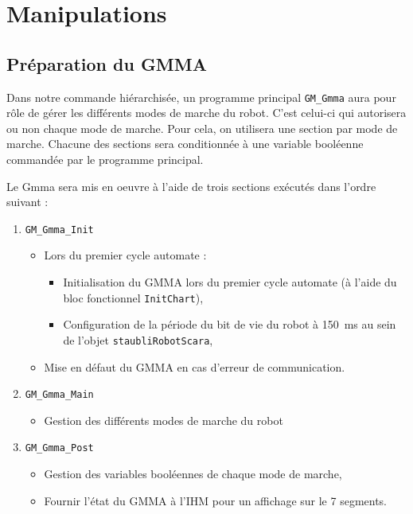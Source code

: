 \section{Manipulations}
\label{sec:manipulations}
\subsection{Préparation du GMMA}
\label{subsec:preparation_gmma}

Dans notre commande hiérarchisée, un programme principal \texttt{GM\_Gmma} aura pour rôle de gérer les différents modes de marche du robot. C'est celui-ci qui autorisera ou non chaque mode de marche. Pour cela, on utilisera une section par mode de marche. Chacune des sections sera conditionnée à une variable booléenne commandée par le programme principal.

Le Gmma sera mis en oeuvre à l'aide de trois sections exécutés dans l'ordre suivant :
\begin{enumerate}
    \item \texttt{GM\_Gmma\_Init}
    \begin{itemize}
        \item Lors du premier cycle automate : 
        \begin{itemize}
            \item Initialisation du GMMA lors du premier cycle automate (à l'aide du bloc fonctionnel \texttt{InitChart}),
            \item Configuration de la période du bit de vie du robot à \SI{150}{ms} au sein de l'objet \texttt{staubliRobotScara},
        \end{itemize}
        \item Mise en défaut du GMMA en cas d'erreur de communication.
    \end{itemize}
    \item \texttt{GM\_Gmma\_Main}
    \begin{itemize}
        \item Gestion des différents modes de marche du robot
    \end{itemize}
    \item \texttt{GM\_Gmma\_Post}
    \begin{itemize}
        \item Gestion des variables booléennes de chaque mode de marche,
        \item Fournir l'état du GMMA à l'IHM pour un affichage sur le 7 segments.
    \end{itemize}
\end{enumerate}

